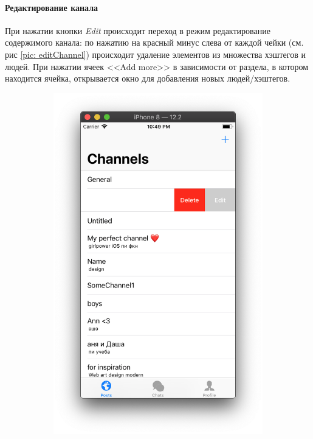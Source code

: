 \documentclass[a4paper,12pt]{article}
\begin{document}
	\paragraph{Редактирование канала\\}
	При  нажатии кнопки \textit{Edit} происходит переход в режим редактирование содержимого канала: по нажатию на красный минус слева от каждой чейки (см. рис \ref{pic: editChannel}) происходит удаление элементов из множества хэштегов и людей. При нажатии ячеек <<Add more>> в зависимости от раздела, в котором находится ячейка, открывается окно для добавления новых людей/хэштегов.
	\begin{figure}[h!]
		\centering
		\begin{subfigure}[b]{0.3\linewidth}
			\includegraphics[width=\linewidth]{../includes/pmi/edit.png}

\end{subfigure}
\end{figure}
\end{document}

